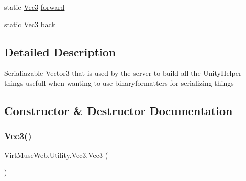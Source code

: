 \begin{DoxyCompactItemize}
\item 
static \mbox{\hyperlink{class_virt_muse_web_1_1_utility_1_1_vec3}{Vec3}} \mbox{\hyperlink{class_virt_muse_web_1_1_utility_1_1_vec3_ae99a74aa6db7d7ffed99cc43b4f45042}{forward}}
\item 
static \mbox{\hyperlink{class_virt_muse_web_1_1_utility_1_1_vec3}{Vec3}} \mbox{\hyperlink{class_virt_muse_web_1_1_utility_1_1_vec3_a417a653752c283371b0ff1215ef882b3}{back}}
\end{DoxyCompactItemize}


\subsection{Detailed Description}
Serialiazable Vector3 that is used by the server to build all the Unity\+Helper things usefull when wanting to use binaryformatters for serializing things 



\subsection{Constructor \& Destructor Documentation}
\mbox{\label{class_virt_muse_web_1_1_utility_1_1_vec3_a34b343ad30e74ac4e1d92f79a420b0a0}} 
\subsubsection{\texorpdfstring{Vec3()}{Vec3()}\hspace{0.1cm}{\footnotesize\ttfamily [1/3]}}
{\footnotesize\ttfamily Virt\+Muse\+Web.\+Utility.\+Vec3.\+Vec3 (\begin{DoxyParamCaption}{ }\end{DoxyParamCaption})}

\mbox{\label{class_virt_muse_web_1_1_utility_1_1_vec3_a3cd8f9a64e039ce9ccc8635a3e596cb8}} 
